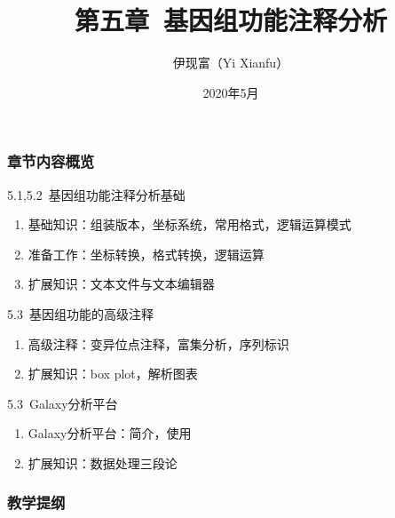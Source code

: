 




\title[基因组功能注释分析]{第五章\ 基因组功能注释分析}
\author[Yixf]{伊现富（Yi Xianfu）}
\date{2020年5月}

\begin{frame}
  \titlepage
\end{frame}

\begin{frame}
  \frametitle{章节内容概览}
  \begin{block}{5.1,5.2\ 基因组功能注释分析基础}
    \begin{enumerate}
      \item 基础知识：组装版本，坐标系统，常用格式，逻辑运算模式
      \item 准备工作：坐标转换，格式转换，逻辑运算
      \item 扩展知识：文本文件与文本编辑器
    \end{enumerate}
  \end{block}
  \begin{block}{5.3\ 基因组功能的高级注释}
    \begin{enumerate}
      \item 高级注释：变异位点注释，富集分析，序列标识
      \item 扩展知识：box plot，解析图表
    \end{enumerate}
  \end{block}
  \begin{block}{5.3\ Galaxy分析平台}
    \begin{enumerate}
      \item Galaxy分析平台：简介，使用
      \item 扩展知识：数据处理三段论
    \end{enumerate}
  \end{block}
\end{frame}

\begin{frame}[plain]
  \frametitle{教学提纲}
  \setcounter{tocdepth}{2}
  \begin{multicols}{2}
  \tableofcontents
  \end{multicols}
\end{frame}








